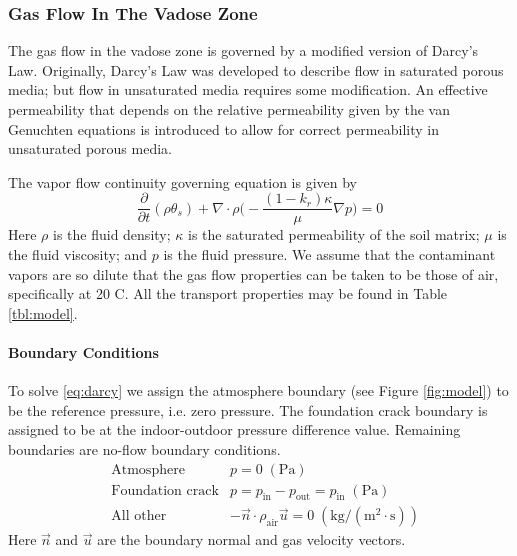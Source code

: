 \subsubsection{Gas Flow In The Vadose Zone}\label{sec:darcy}

The gas flow in the vadose zone is governed by a modified version of Darcy's Law.
Originally, Darcy's Law was developed to describe flow in saturated porous media; but flow in unsaturated media requires some modification.
An effective permeability that depends on the relative permeability given by the van Genuchten equations is introduced to allow for correct permeability in unsaturated porous media.\par

The vapor flow continuity governing equation is given by
\begin{equation}\label{eq:darcy}
  \frac{\partial}{\partial t} (\rho \theta_s) + \nabla \cdot \rho \Big( -\frac{(1-k_r) \kappa}{\mu} \nabla p \Big) = 0
\end{equation}
Here $\rho$ is the fluid density;
$\kappa$ is the saturated permeability of the soil matrix;
$\mu$ is the fluid viscosity; and $p$ is the fluid pressure.
We assume that the contaminant vapors are so dilute that the gas flow properties can be taken to be those of air, specifically at 20 \degree C.
All the transport properties may be found in Table \ref{tbl:model}.\par

\paragraph{Boundary Conditions}

To solve \eqref{eq:darcy} we assign the atmosphere boundary (see Figure \ref{fig:model}) to be the reference pressure, i.e. zero pressure.
The foundation crack boundary is assigned to be at the indoor-outdoor pressure difference value.
Remaining boundaries are no-flow boundary conditions.
\begin{align}
  &\text{Atmosphere} &p = 0 \; \mathrm{(Pa)} \\
  &\text{Foundation crack} &p = p_\mathrm{in} - p_\mathrm{out} = p_\mathrm{in} \; \mathrm{(Pa)} \\
  &\text{All other} &-\vec{n}\cdot\rho_\mathrm{air}\vec{u} = 0 \; \mathrm{(kg/(m^2\cdot s))}
\end{align}
Here $\vec{n}$ and $\vec{u}$ are the boundary normal and gas velocity vectors.

